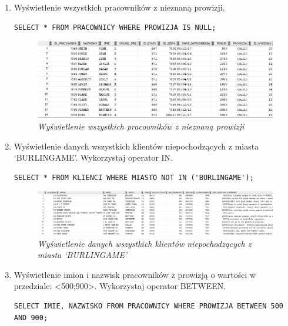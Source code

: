 \documentclass[a4paper, 10pt]{article}
\begin{document}
\begin{enumerate}
\item Wyświetlenie wszystkich pracowników z nieznaną prowizji.  
\begin{lstlisting}[style=SQL, caption=\textit{Wyświetlenie wszystkich pracowników z nieznaną prowizji}]
SELECT * FROM PRACOWNICY WHERE PROWIZJA IS NULL;
\end{lstlisting}

\begin{figure}[H]
	\centering
	\includegraphics[scale=0.7]{zadanie3.png}
	\caption{\textit{Wyświetlenie wszystkich pracowników z nieznaną prowizji}}
\end{figure}


\item Wyświetlenie danych wszystkich klientów niepochodzących z miasta `BURLINGAME'. Wykorzystaj operator IN. 
\begin{lstlisting}[style=SQL, caption=\textit{Wyświetlenie danych wszystkich klientów niepochodzących z miasta `BURLINGANE'}]
SELECT * FROM KLIENCI WHERE MIASTO NOT IN ('BURLINGAME');
\end{lstlisting}

\begin{figure}[H]
	\centering
	\includegraphics[scale=0.5]{zadanie4.png}
	\caption{\textit{Wyświetlenie danych wszystkich klientów niepochodzących z miasta `BURLINGAME'}}
\end{figure}


\item Wyświetlenie imion i nazwisk pracowników z prowizją o wartości w przedziale: <500;900>. Wykorzystaj operator BETWEEN. 
\begin{lstlisting}[style=SQL, caption=\textit{Wyświetlenie imion i nazwisk pracowników z prowizją o wartości w przedziale: <500;900>}]
SELECT IMIE, NAZWISKO FROM PRACOWNICY WHERE PROWIZJA BETWEEN 500 AND 900;
\end{lstlisting}


\end{enumerate}
\end{document}
